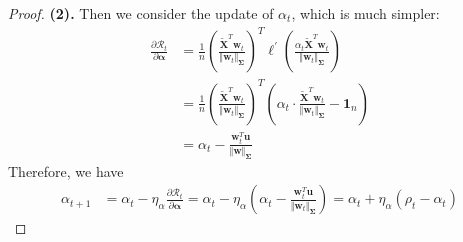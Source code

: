 \documentclass[pdflatex,sn-basic]{sn-jnl}%
\theoremstyle{thmstyleone}%
\begin{document}
\begin{appendices}
\begin{proof}
  \noindent \textbf{(2).}
  Then we consider the update of $\alpha_t$, which is much simpler:
  \begin{equation*}
  \begin{aligned}
    \frac{\partial \mathcal{R}_t}{\partial \mathbf{\alpha}} & = 
    \frac{1}{n}
    \left(
      \frac{
        \tilde{\mathbf{X}}^{T} \mathbf{w}_t
        }{ \Vert \mathbf{w}_t \Vert_\mathbf{\Sigma}}
    \right)^T 
    \boldsymbol{\ell^\prime}\left(
      \frac{
      \alpha_t \tilde{\mathbf{X}}^T \mathbf{w}_t
      }{\Vert \mathbf{w}_t \Vert_\mathbf{\Sigma}}
    \right)
    \\ & = 
    \frac{1}{n}
    \left(
      \frac{
        \tilde{\mathbf{X}}^{T} \mathbf{w}_t
        }{ \Vert \mathbf{w}_t \Vert_\mathbf{\Sigma}}
    \right)^T 
    \left(
      \alpha_t \cdot \frac{
        \tilde{\mathbf{X}}^{T} \mathbf{w}_t
        }{ \Vert \mathbf{w}_t \Vert_\mathbf{\Sigma}} - \mathbf{1}_{n}
    \right)
    \\ & = 
    \alpha_t - \frac{\mathbf{w}_t^T \mathbf{u}}{\Vert \mathbf{w}\Vert_{\mathbf{\Sigma}}}
  \end{aligned}
  \end{equation*}
  Therefore, we have 
  \begin{equation*}
  \begin{aligned}
    \alpha_{t+1} 
    & = 
    \alpha_t - \eta_{\alpha} \frac{\partial \mathcal{R}_t}{\partial \mathbf{\alpha}} 
    = 
    \alpha_t
    -
    \eta_{\alpha}
    \left(
      \alpha_t - \frac{\mathbf{w}_{t}^{T} \mathbf{u}}{\Vert \mathbf{w}_{t} \Vert_{\mathbf{\Sigma}}}
    \right)
    = 
    \alpha_t
    +
    \eta_{\alpha}
    \left(
      \rho_{t} - \alpha_t
    \right)
  \end{aligned}
  \end{equation*}
\end{proof}


\end{appendices}
\end{document}
